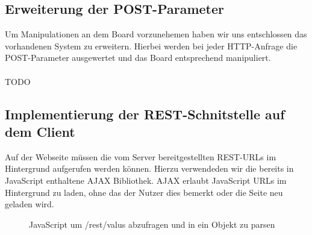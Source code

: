 
\subsection{Erweiterung der POST-Parameter}
Um Manipulationen an dem Board vorzunehemen haben wir uns entschlossen das
vorhandenen System zu erweitern. Hierbei werden bei jeder HTTP-Anfrage die
POST-Parameter ausgewertet und das Board entsprechend manipuliert.\\
\\
TODO

\subsection{Implementierung der REST-Schnitstelle auf dem Client}
Auf der Webseite müssen die vom Server bereitgestellten REST-URLs im Hintergrund
aufgerufen werden können. Hierzu verwendeden wir die bereits in JavaScript
enthaltene AJAX Bibliothek. AJAX erlaubt JavaScript URLs im Hintergrund zu
laden, ohne das der Nutzer dies bemerkt oder die Seite neu geladen wird. 

\begin{figure}[H]

\caption{JavaScript um \textrm{/rest/valus} abzufragen und in ein Objekt zu
parsen}
\label{Ein typischer AJAX-Request}
\end{figure}

